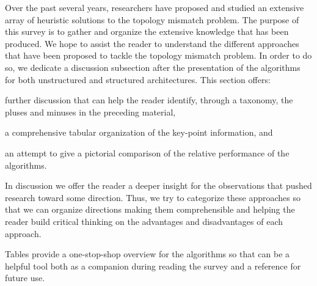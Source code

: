 Over the past several years, researchers have proposed and studied an extensive
array of heuristic solutions to the topology mismatch problem. The purpose of
this survey is to gather and organize the extensive knowledge that has been
produced. We hope to assist the reader to understand the different approaches
that have been proposed to tackle the topology mismatch problem. In order to do
so, we dedicate a discussion subsection after the presentation of the algorithms
for both unstructured and structured architectures. This section offers:
\begin{inparaenum}
  \item further discussion that can help the reader identify, through
a taxonomy, the pluses and minuses in the preceding material,
  \item a comprehensive tabular organization of the key-point information, and
  \item an attempt to give a pictorial comparison of the relative performance of
the algorithms.
\end{inparaenum}

In discussion we offer the reader a deeper insight for the observations that
pushed research toward some direction. Thus, we try to categorize these
approaches so that we can organize directions making them comprehensible
and helping the reader build critical thinking on the advantages and
disadvantages of each approach.

Tables provide a one-stop-shop overview for the algorithms so that can be a
helpful tool both as a companion during reading the survey and a reference for
future use.

